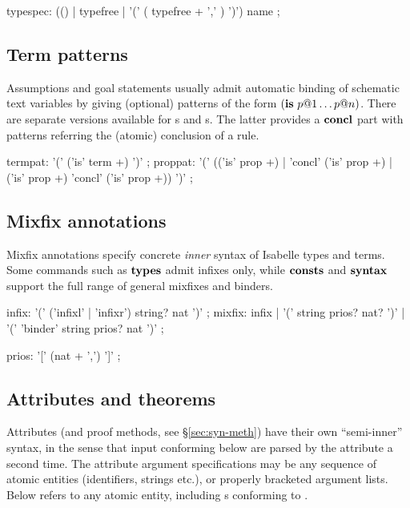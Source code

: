 \begin{rail}
  typespec: (() | typefree | '(' ( typefree + ',' ) ')') name
  ;
\end{rail}


\subsection{Term patterns}\label{sec:term-pats}

Assumptions and goal statements usually admit automatic binding of schematic
text variables by giving (optional) patterns of the form $({\mathord{\mathbf{is}}}~p@1 \dots p@n)$.
There are separate versions available for s and
s.  The latter provides a ${\mathord{\mathbf{concl}}}$ part with patterns
referring the (atomic) conclusion of a rule.

\begin{rail}
  termpat: '(' ('is' term +) ')'
  ;
  proppat: '(' (('is' prop +) | 'concl' ('is' prop +) | ('is' prop +) 'concl' ('is' prop +)) ')'
  ;
\end{rail}


\subsection{Mixfix annotations}

Mixfix annotations specify concrete \emph{inner} syntax of Isabelle types and
terms.  Some commands such as ${\mathord{\mathbf{types}}}$ admit infixes only, while ${\mathord{\mathbf{consts}}}$ and
${\mathord{\mathbf{syntax}}}$ support the full range of general mixfixes and binders.

\begin{rail}
  infix: '(' ('infixl' | 'infixr') string? nat ')'
  ;
  mixfix: infix | '(' string prios? nat? ')' | '(' 'binder' string prios? nat ')'
  ;

  prios: '[' (nat + ',') ']'
  ;
\end{rail}


\subsection{Attributes and theorems}\label{sec:syn-att}

Attributes (and proof methods, see \S\ref{sec:syn-meth}) have their own
``semi-inner'' syntax, in the sense that input conforming 
below are parsed by the attribute a second time.  The attribute argument
specifications may be any sequence of atomic entities (identifiers, strings
etc.), or properly bracketed argument lists.  Below  refers
to any atomic entity, including s conforming to
.


